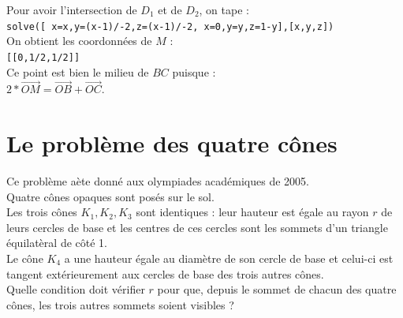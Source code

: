 \documentclass[a4paper,11pt]{book}
\begin{document}
Pour avoir l'intersection de $D_1$ et de $D_2$, on tape :\\
{\tt solve([ x=x,y=(x-1)/-2,z=(x-1)/-2, x=0,y=y,z=1-y],[x,y,z])}\\
On obtient les coordonn\'ees de $M$ :\\
{\tt [[0,1/2,1/2]]}\\
Ce point est bien le milieu de $BC$ puisque :\\
$2*\overrightarrow{OM}=\overrightarrow{OB}+\overrightarrow{OC}$.


\section{Le probl\`eme des quatre c\^ones}
Ce probl\`eme a\`ete donn\'e aux olympiades acad\'emiques de 2005.\\
Quatre c\^ones opaques sont pos\'es sur le sol.\\
Les trois c\^ones $K_1,K_2,K_3$ sont identiques : leur hauteur est \'egale au 
rayon $r$ de leurs cercles de base et les centres de ces cercles sont les 
sommets d'un triangle \'equilat\`eral de c\^ot\'e 1.\\
Le c\^one $K_4$ a une hauteur \'egale au diam\`etre de son cercle de base et 
celui-ci est tangent ext\'erieurement aux cercles de base des trois autres 
c\^ones.\\
Quelle condition doit v\'erifier $r$ pour que, depuis le sommet de chacun des 
quatre c\^ones, les trois autres sommets soient visibles ?
\end{document}

